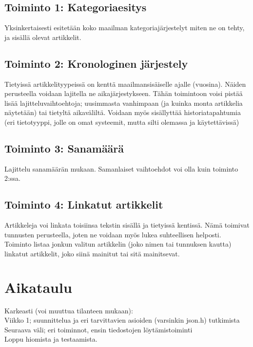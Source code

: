 \documentclass[finnish,11pt,a4paper]{article}
\begin{document}
	\subsection{Toiminto 1: Kategoriaesitys}
		Yksinkertaisesti esitetään koko maailman kategoriajärjestelyt miten ne on tehty, ja sisällä olevat artikkelit. 
	\subsection{Toiminto 2: Kronologinen järjestely}
		Tietyissä artikkelityypeissä on kenttä maailmansisäiselle ajalle (vuosina). Näiden perusteella voidaan lajitella ne aikajärjestykseen. Tähän toimintoon voisi pistää lisää lajitteluvaihtoehtoja; uusimmasta vanhimpaan (ja kuinka monta artikkelia näytetään) tai tietyltä aikaväliltä. Voidaan myös sisällyttää historiatapahtumia (eri tietotyyppi, jolle on omat systeemit, mutta silti olemassa ja käytettävissä)
	\subsection{Toiminto 3: Sanamäärä}
		Lajittelu sanamäärän mukaan. Samanlaiset vaihtoehdot voi olla kuin toiminto 2:ssa. 
	\subsection{Toiminto 4: Linkatut artikkelit}
		Artikkeleja voi linkata toisiinsa tekstin sisällä ja tietyissä kentissä. Nämä toimivat tunnusten perusteella, joten ne voidaan myös lukea suhteellisen helposti. Toiminto listaa jonkun valitun artikkelin (joko nimen tai tunnuksen kautta) linkatut artikkelit, joko siinä mainitut tai sitä mainitsevat. 
	\section{Aikataulu}
		Karkeasti (voi muuttua tilanteen mukaan):\\
		Viikko 1; suunnittelua ja eri tarvittavien asioiden (varsinkin json.h) tutkimista\\
		Seuraava väli; eri toiminnot, ensin tiedostojen löytämistoiminti\\
		Loppu hiomista ja testaamista.
\end{document}
